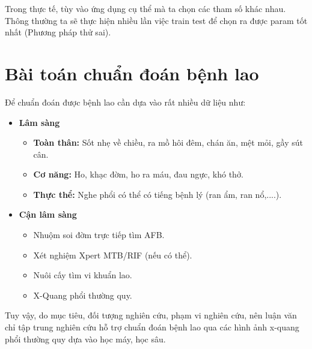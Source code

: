 Trong thực tế, tùy vào ứng dụng cụ thể mà ta chọn các tham số khác nhau. Thông thường ta sẽ thực hiện nhiều lần việc train test để chọn ra được param tốt nhất (Phương pháp thử sai).

\section{Bài toán chuẩn đoán bệnh lao}
Để chuẩn đoán được bệnh lao cần dựa vào rất nhiều dữ liệu \cite{bytchuandoanlao} như: 
\begin{itemize}
	\item {\bfseries Lâm sàng}
	\begin{itemize}
		\item {\bfseries Toàn thân:} Sốt nhẹ về chiều, ra mồ hôi đêm, chán ăn, mệt mỏi, gầy sút cân.
		\item {\bfseries Cơ năng:} Ho, khạc đờm, ho ra máu, đau ngực, khó thở.
		\item {\bfseries Thực thể:} Nghe phổi có thể có tiếng bệnh lý (ran ẩm, ran nổ,....).
	\end{itemize}
	\item {\bfseries Cận lâm sàng}
	\begin{itemize}
		\item Nhuộm soi đờm trực tiếp tìm AFB.
		\item Xét nghiệm Xpert MTB/RIF (nếu có thể).
		\item Nuôi cấy tìm vi khuẩn lao.
		\item X-Quang phổi thường quy.
	\end{itemize}
\end{itemize}

Tuy vậy, do mục tiêu, đối tượng nghiên cứu, phạm vi nghiên cứu, nên luận văn chỉ tập trung nghiên cứu hỗ trợ chuẩn đoán bệnh lao qua các hình ảnh x-quang phổi thường quy dựa vào học máy, học sâu.

